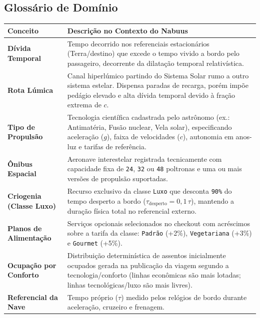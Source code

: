 \documentclass[12pt, a4paper]{article}
\begin{document}
\subsection{Glossário de Domínio}
\begin{table}[H]
\centering
\renewcommand{\arraystretch}{1.25}
\begin{tabularx}{\textwidth}{>{\bfseries}l X}
\toprule
Conceito & Descrição no Contexto do Nabuus \\
\midrule
Dívida Temporal & Tempo decorrido nos referenciais estacionários (Terra/destino) que excede o tempo vivido a bordo pelo passageiro, decorrente da dilatação temporal relativística. \\
Rota Lúmica & Canal hiperlúmico partindo do Sistema Solar rumo a outro sistema estelar. Dispensa paradas de recarga, porém impõe pedágio elevado e alta dívida temporal devido à fração extrema de $c$. \\
Tipo de Propulsão & Tecnologia científica cadastrada pelo astrônomo (ex.: Antimatéria, Fusão nuclear, Vela solar), especificando aceleração ($g$), faixa de velocidades ($c$), autonomia em anos-luz e tarifas de referência. \\
Ônibus Espacial & Aeronave interestelar registrada tecnicamente com capacidade fixa de \texttt{24}, \texttt{32} ou \texttt{48} poltronas e uma ou mais versões de propulsão suportadas. \\
Criogenia (Classe Luxo) & Recurso exclusivo da classe \texttt{Luxo} que desconta \texttt{90\%} do tempo desperto a bordo (\(\tau_{\text{desperto}} = 0{,}1\,\tau\)), mantendo a duração física total no referencial externo. \\
Planos de Alimentação & Serviços opcionais selecionados no checkout com acréscimos sobre a tarifa da classe: \texttt{Padrão} (+2\%), \texttt{Vegetariana} (+3\%) e \texttt{Gourmet} (+5\%). \\
Ocupação por Conforto & Distribuição determinística de assentos inicialmente ocupados gerada na publicação da viagem segundo a tecnologia/conforto (linhas econômicas são mais lotadas; linhas tecnológicas/luxo são mais livres). \\
Referencial da Nave & Tempo próprio ($\tau$) medido pelos relógios de bordo durante aceleração, cruzeiro e frenagem. \\
\bottomrule
\end{tabularx}
\end{table}

\end{document}
